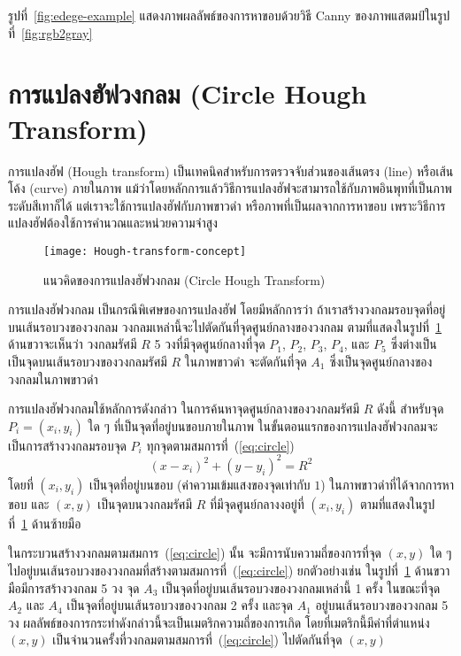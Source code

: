 รูปที่~\ref{fig:edege-example} แสดงภาพผลลัพธ์ของการหาขอบด้วยวิธี Canny ของภาพแสตมป์ในรูปที่~\ref{fig:rgb2gray} 

\section{การแปลงฮัฟวงกลม (Circle Hough Transform)}
การแปลงฮัฟ (Hough transform) เป็นเทคนิคสำหรับการตรวจจับส่วนของเส้นตรง (line) หรือเส้นโค้ง (curve) ภายในภาพ แม้ว่าโดยหลักการแล้ววิธีการแปลงฮัฟจะสามารถใช้กับภาพอินพุทที่เป็นภาพระดับสีเทาก็ได้ แต่เราจะใช้การแปลงฮัฟกับภาพขาวดำ หรือภาพที่เป็นผลจากการหาขอบ เพราะวิธีการแปลงฮัฟต้องใช้การคำนวณและหน่วยความจำสูง

\begin{figure}[!ht]
\centering
\texttt{[image: Hough-transform-concept]}
\caption{แนวคิดของการแปลงฮัฟวงกลม (Circle Hough Transform)}
\label{fig:hough-concept}
\end{figure}
การแปลงฮัฟวงกลม เป็นกรณีพิเศษของการแปลงฮัฟ โดยมีหลักการว่า ถ้าเราสร้างวงกลมรอบจุดที่อยู่บนเส้นรอบวงของวงกลม วงกลมเหล่านี้จะไปตัดกันที่จุดศูนย์กลางของวงกลม ตามที่แสดงในรูปที่~\ref{fig:hough-concept} ด้านขวาจะเห็นว่า  วงกลมรัศมี $R$ 5 วงที่มีจุดศูนย์กลางที่จุด $P_1$, $P_2$, $P_3$, $P_4$, และ $P_5$ ซึ่งต่างเป็นเป็นจุดบนเส้นรอบวงของวงกลมรัศมี $R$ ในภาพขาวดำ จะตัดกันที่จุด $A_1$ ซึ่งเป็นจุดศูนย์กลางของวงกลมในภาพขาวดำ 

การแปลงฮัฟวงกลมใช้หลักการดังกล่าว ในการค้นหาจุดศูนย์กลางของวงกลมรัศมี $R$ ดังนี้
สำหรับจุด $P_i = (x_i, y_i)$ ใด ๆ ที่เป็นจุดที่อยู่บนขอบภายในภาพ ในขั้นตอนแรกของการแปลงฮัฟวงกลมจะเป็นการสร้างวงกลมรอบจุด $P_i$ ทุกจุดตามสมการที่~(\ref{eq:circle})
\begin{equation}
(x - x_i)^2 + (y-y_i)^2 = R^2\label{eq:circle}
\end{equation}
โดยที่ $(x_i, y_i)$ เป็นจุดที่อยู่บนขอบ (ค่าความเข้มแสงของจุดเท่ากับ $1$) ในภาพขาวดำที่ได้จากการหาขอบ และ $(x,y)$ เป็นจุดบนวงกลมรัศมี $R$ ที่มีจุดศูนย์กลางงอยู่ที่ $(x_i,y_i)$ ตามที่แสดงในรูปที่~\ref{fig:hough-concept} ด้านซ้ายมือ

ในกระบวนสร้างวงกลมตามสมการ~(\ref{eq:circle}) นั้น จะมีการนับความถี่ของการที่จุด $(x, y)$ ใด ๆ  ไปอยู่บนเส้นรอบวงของวงกลมที่สร้างตามสมการที่~(\ref{eq:circle}) ยกตัวอย่างเช่น ในรูปที่~\ref{fig:hough-concept} ด้านขวามือมีการสร้างวงกลม 5 วง จุด $A_3$ เป็นจุดที่อยู่บนเส้นรอบวงของวงกลมเหล่านี้ 1 ครั้ง ในขณะที่จุด $A_2$ และ $A_4$ เป็นจุดที่อยู่บนเส้นรอบวงของวงกลม 2 ครั้ง และจุด $A_1$ อยู่บนเส้นรอบวงของวงกลม 5 วง  ผลลัพธ์ของการกระทำดังกล่าวนี้จะเป็นเมตริกความถี่ของการเกิด โดยที่เมตริกนี้มีค่าที่ตำแหน่ง $(x,y)$ เป็นจำนวนครั้งที่วงกลมตามสมการที่~(\ref{eq:circle}) ไปตัดกันที่จุด $(x,y)$ 


